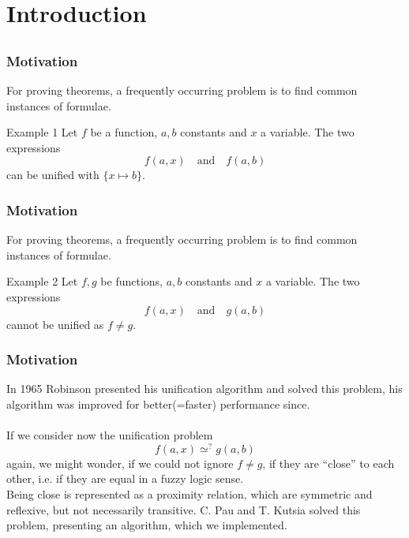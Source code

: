 \section{Introduction} \subsection{}

\begin{frame}[fragile=singleslide]
	\frametitle{Motivation}
		For proving theorems, a frequently occurring problem is to find common instances of formulae.
		\begin{exampleblock}{Example 1}
			Let \(f\) be a function, \(a,b\) constants and \(x\) a variable. The two expressions
			\[f(a,x)\quad\text{and}\quad f(a,b)\]
			can be unified with \(\{x\mapsto b\}\).
		\end{exampleblock}

  \end{frame}	
		

\begin{frame}[fragile=singleslide]
	\frametitle{Motivation}
		For proving theorems, a frequently occurring problem is to find common instances of formulae.
		\begin{exampleblock}{Example 2}
			Let \(f,g\) be functions, \(a,b\) constants and \(x\) a variable. The two expressions
			\[f(a,x)\quad\text{and}\quad g(a,b)\]
			cannot be unified as \(f\neq g\).
		\end{exampleblock}

  \end{frame}	
		
				
\begin{frame}[fragile=singleslide]
	\frametitle{Motivation}
		In 1965 Robinson presented his unification algorithm and solved this problem, his algorithm was improved for better(=faster) performance since.\\ \ \\
		If we consider now the unification problem \[f(a,x)\simeq^{?} g(a,b)\] again, we might wonder, if we could not ignore \(f\neq g\), if they are ``close'' to each other, i.e. if they are equal in a fuzzy logic sense.\\
		Being close is represented as a proximity relation, which are symmetric and reflexive, but not necessarily transitive. C. Pau and T. Kutsia solved this problem, presenting an algorithm, which we implemented.

  \end{frame}	
		
